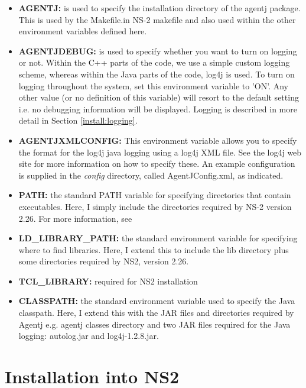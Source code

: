 \begin{itemize}
\item \textbf{AGENTJ:} is used to specify the installation directory of the agentj
package. This is used by the Makefile.in NS-2 makefile and also used within the other environment variables defined here.

\item \textbf{AGENTJDEBUG:} is used to specify whether you want to turn on logging or not.  Within the C++ parts of the code, we use a simple custom logging scheme, whereas within the Java parts of the code, log4j is used.  To turn on logging throughout the system, set this environment variable to 'ON'. Any other value (or no definition of this variable) will resort to the default setting i.e. no debugging information will be displayed.  Logging is described in more detail in Section \ref{install:logging}.

\item \textbf{AGENTJXMLCONFIG:} This environment variable allows you to specify the format for the log4j java logging using a log4j XML file.  See the log4j web site \cite{log4j} for more information on how to specify these.  An example configuration is supplied in the \emph{config} directory, called AgentJConfig.xml, as indicated.

\item \textbf{PATH:} the standard PATH variable for specifying directories that contain executables.  Here, I simply include the directories required by NS-2 version 2.26.  For more information, see \cite{ns2} 

\item \textbf{LD\_LIBRARY\_PATH:} the standard environment variable for specifying where to find libraries.  Here, I extend this to include the \agentj  lib directory plus some directories required by NS2, version 2.26.

\item \textbf{TCL\_LIBRARY:} required for NS2 installation

\item \textbf{CLASSPATH:} the standard environment variable used to specify the Java classpath.  Here, I extend this with the JAR files and directories required by Agentj e.g.  
  agentj classes directory and two JAR files required for the Java logging: autolog.jar and  log4j-1.2.8.jar.
\end{itemize}

\section{Installation into NS2}
\label{install:install}

